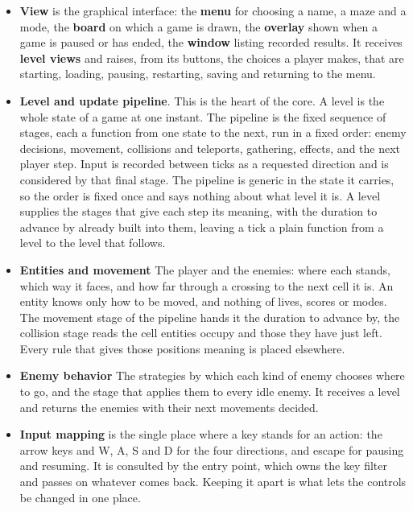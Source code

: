 \begin{itemize}
  in a mode. Operations that may fail return either the requested value or a sentence explaining why not; read-only
  queries that cannot fail return their value directly. It is the one seam at which the entirety of the outside can be
  replaced during testing.
  \item \textbf{View} is the graphical interface: the \textbf{menu} for choosing a name, a maze and a mode, the \textbf{board}
  on which a game is drawn, the \textbf{overlay} shown when a game is paused or has ended, the \textbf{window}
  listing recorded results. It receives\textbf{ level views} and raises, from its buttons, the choices a player
  makes, that are starting, loading, pausing, restarting, saving and returning to the menu.
  \item \textbf{Level and update pipeline}. This is the heart of the core. A level is the whole state of a game at one instant.
  The pipeline is the fixed sequence of stages, each a function from one state to the next, run in a fixed order:
  enemy decisions, movement, collisions and teleports, gathering, effects, and the next player step. Input is
  recorded between ticks as a requested direction and is considered by that final stage. The pipeline is generic in
  the state it carries, so the order is fixed once and says nothing about what level it is. A level supplies the
  stages that give each step its meaning, with the duration to advance by already built into them, leaving a tick a
  plain function from a level to the level that follows.
  \item \textbf{Entities and movement} The player and the enemies: where each stands, which way it faces, and how far through a
  crossing to the next cell it is. An entity knows only how to be moved, and nothing of lives, scores or modes. The movement
  stage of the pipeline hands it the duration to advance by, the collision stage reads the cell entities occupy and those they
  have just left. Every rule that gives those positions meaning is placed elsewhere.
  \item \textbf{Enemy behavior} The strategies by which each kind of enemy chooses where to go, and the stage that applies them
  to every idle enemy. It receives a level and returns the enemies with their next movements decided.
  \item \textbf{Input mapping} is the single place where a key stands for an action: the arrow keys and W, A, S and D for
  the four directions, and escape for pausing and resuming. It is consulted by the entry point, which owns the
  key filter and passes on whatever comes back. Keeping it apart is what lets the controls be changed in one place.

\end{itemize}
